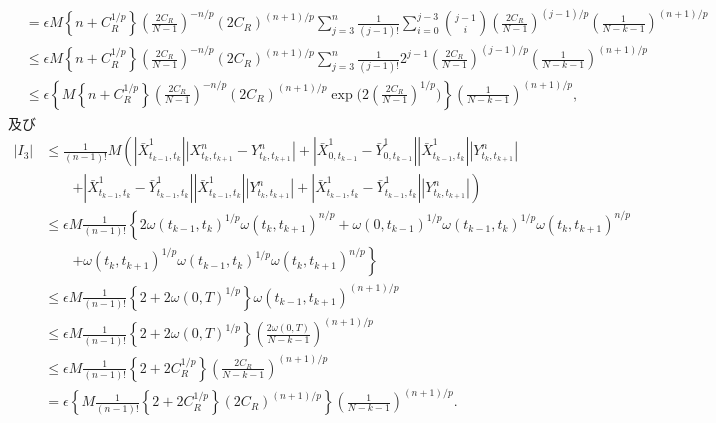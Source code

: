 \begin{prf}
\begin{description}
\begin{align}
					&= \epsilon M \left\{ n + C_R^{1/p} \right\} \left( \frac{2C_R}{N-1} \right)^{-n/p}(2C_R)^{(n+1)/p}
						\sum_{j=3}^n \frac{1}{(j-1)!} \sum_{i=0}^{j-3} \binom{j-1}{i} \left( \frac{2C_R}{N-1} \right)^{(j-1)/p}
						\left( \frac{1}{N-k-1} \right)^{(n+1)/p} \\
					&\leq \epsilon M \left\{ n + C_R^{1/p} \right\} \left( \frac{2C_R}{N-1} \right)^{-n/p}(2C_R)^{(n+1)/p}
						\sum_{j=3}^n \frac{1}{(j-1)!} 2^{j-1} \left( \frac{2C_R}{N-1} \right)^{(j-1)/p}
						\left( \frac{1}{N-k-1} \right)^{(n+1)/p} \\
					&\leq \epsilon \left\{ M \left\{ n + C_R^{1/p} \right\} \left( \frac{2C_R}{N-1} \right)^{-n/p}(2C_R)^{(n+1)/p}
						\operatorname{exp}\Biggl( 2\left(\frac{2C_R}{N-1}\right)^{1/p} \Biggr) \right\}
						\left( \frac{1}{N-k-1} \right)^{(n+1)/p},
				\end{align}
				及び
				\begin{align}
					|I_3| &\leq \frac{1}{(n-1)!}M \left( \left|\bar{X}^1_{t_{k-1},t_k}\right|\left|X^n_{t_k,t_{k+1}} - Y^n_{t_k,t_{k+1}}\right|
						+ \left|\bar{X}^1_{0,t_{k-1}}-\bar{Y}^1_{0,t_{k-1}}\right|\left|\bar{X}^1_{t_{k-1},t_k}\right|\left|Y^n_{t_k,t_{k+1}}\right| \right. \\
						&\qquad \left. + \left|\bar{X}^1_{t_{k-1},t_k}-\bar{Y}^1_{t_{k-1},t_k}\right|\left|\bar{X}^1_{t_{k-1},t_k}\right|\left|Y^n_{t_k,t_{k+1}}\right|
						+ \left|\bar{X}^1_{t_{k-1},t_k}-\bar{Y}^1_{t_{k-1},t_k}\right|\left|Y^n_{t_k,t_{k+1}}\right| \right) \\
					&\leq \epsilon M \frac{1}{(n-1)!} \left\{ 2 \omega(t_{k-1},t_k)^{1/p} \omega(t_k,t_{k+1})^{n/p} 
						+ \omega(0,t_{k-1})^{1/p} \omega(t_{k-1},t_k)^{1/p} \omega(t_k,t_{k+1})^{n/p} \right. \\ 
						&\qquad \left. + \omega(t_k,t_{k+1})^{1/p} \omega(t_{k-1},t_k)^{1/p} \omega(t_k,t_{k+1})^{n/p} \right\} \\
					&\leq \epsilon M \frac{1}{(n-1)!} \left\{ 2 + 2 \omega(0,T)^{1/p} \right\} \omega(t_{k-1},t_{k+1})^{(n+1)/p} \\
					&\leq \epsilon M \frac{1}{(n-1)!} \left\{ 2 + 2 \omega(0,T)^{1/p} \right\} \left( \frac{2\omega(0,T)}{N-k-1} \right)^{(n+1)/p} \\
					&\leq \epsilon M \frac{1}{(n-1)!} \left\{ 2 + 2 C_R^{1/p} \right\} \left( \frac{2C_R}{N-k-1} \right)^{(n+1)/p} \\
					&= \epsilon \left\{ M \frac{1}{(n-1)!} \left\{ 2 + 2 C_R^{1/p} \right\} (2C_R)^{(n+1)/p} \right\} \left( \frac{1}{N-k-1} \right)^{(n+1)/p}.

\end{align}
\end{description}
\end{prf}

